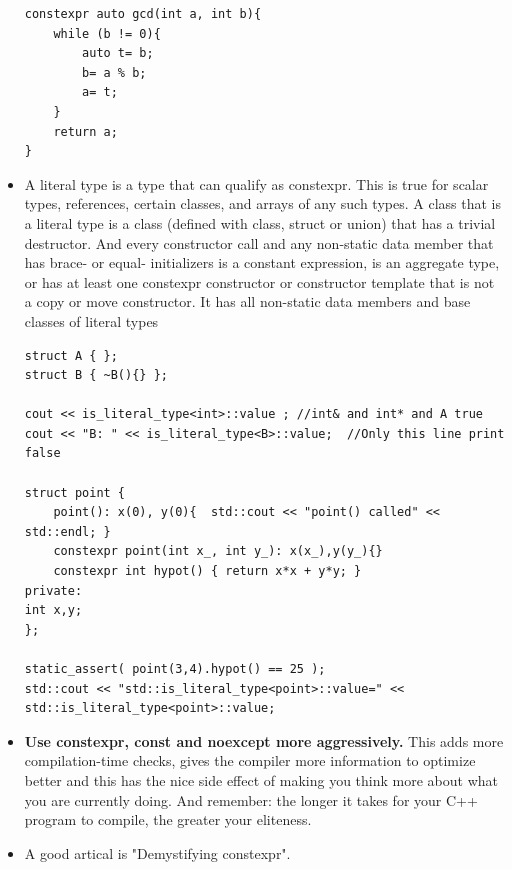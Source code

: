 \documentclass[a4paper,11pt,twoside]{book}
\begin{document}
\begin{itemize}
\begin{lstlisting}[numbers=none]
constexpr auto gcd(int a, int b){
	while (b != 0){
		auto t= b;
		b= a % b;
		a= t;
	}
	return a;
}
\end{lstlisting}
    \item A literal type is a type that can qualify as constexpr. This is true for scalar types, references, certain classes, and arrays of any such types. A class that is a literal type is a class (defined with class, struct or union) that has a trivial destructor. And every constructor call and any non-static data member that has brace- or equal- initializers is a constant expression, is an aggregate type, or has at least one constexpr constructor or constructor template that is not a copy or move constructor. It has all non-static data members and base classes of literal types 
\begin{lstlisting}[]
struct A { };
struct B { ~B(){} };

cout << is_literal_type<int>::value ; //int& and int* and A true
cout << "B: " << is_literal_type<B>::value;  //Only this line print false

struct point {
	point(): x(0), y(0){  std::cout << "point() called" << std::endl; }
	constexpr point(int x_, int y_): x(x_),y(y_){}
	constexpr int hypot() { return x*x + y*y; }
private:
int x,y;
};

static_assert( point(3,4).hypot() == 25 );
std::cout << "std::is_literal_type<point>::value=" << std::is_literal_type<point>::value;
\end{lstlisting}
	
	\item \textbf{Use constexpr, const and noexcept more aggressively.} This adds more compilation-time checks, gives the compiler more information to optimize better and this has the nice side effect of making you think more about what you are currently doing. And remember: the longer it takes for your C++ program to compile, the greater your eliteness.

	\item A good artical is "Demystifying constexpr". 
\end{itemize}
\end{document}
